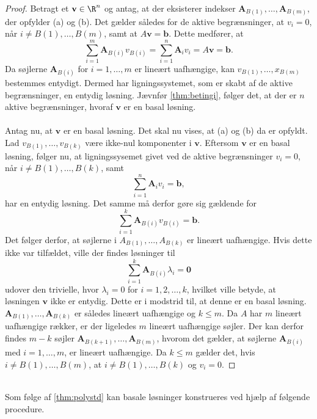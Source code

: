 \begin{proof}
Betragt et $\textbf{v} \in \R^n$ og antag, at der eksisterer indekser $\mathbf{A}_{B(1)},\ldots,\mathbf{A}_{B(m)}$, der opfylder (a) og (b).
%
Det gælder således for de aktive begrænsninger, at $v_i=0$, når $i\neq B(1),\ldots,B(m)$, samt at $A\textbf{v}=\mathbf{b}$.
Dette medfører, at 
%
$$\sum_{i=1}^{m}\textbf{A}_{B(i)}v_{B(i)}=\sum_{i=1}^{n}\textbf{A}_i v_i=A\textbf{v}=\textbf{b}.$$
%
Da søjlerne $\textbf{A}_{B(i)}$ for $i=1,\ldots,m$ er lineært uafhængige, kan $v_{B(1)},\ldots,x_{B(m)}$ bestemmes entydigt. 
Dermed har ligningssystemet, som er skabt af de aktive begrænsninger, en entydig løsning.
Jævnfør \ref{thm:betingi},
følger det, at der er $n$ aktive begrænsninger, hvoraf $\mathbf{v}$ er en basal løsning. 
\\\\
%
%
Antag nu, at $\mathbf{v}$ er en basal løsning. 
Det skal nu vises, at (a) og (b) da er opfyldt.
Lad $v_{B(1)},\ldots,v_{B(k)}$ være ikke-nul komponenter i $\textbf{v}$.
Eftersom $\mathbf{v}$ er en basal løsning, følger nu, at ligningssysemet givet ved de aktive begrænsninger $v_i=0$, når $i\neq B(1),\ldots,B(k)$, samt  $$\sum_{i=1}^{n}\mathbf{A}_i v_i=\mathbf{b},$$ har en entydig løsning. 
Det samme må derfor gøre sig gældende for $$\sum_{i=1}^{k}\mathbf{A}_{B(i)}v_{B(i)}=\mathbf{b}.$$
Det følger derfor, at søjlerne i $A_{B(1)},\ldots,A_{B(k)}$ er lineært uafhængige.
%
Hvis dette ikke var tilfældet, ville der findes løsninger til $$\sum_{i=1}^{k}\mathbf{A}_{B(i)} \lambda_i=\mathbf{0}$$ udover den trivielle, hvor $\lambda_i=0$ for $i=1,2,\ldots,k$, hvilket ville betyde, at løsningen $\mathbf{v}$ ikke er entydig. 
Dette er i modstrid til, at denne er en basal løsning.
$\mathbf{A}_{B(1)},\ldots ,\mathbf{A}_{B(k)}$ er således lineært uafhængige og $k \leq m$.
Da $A$ har $m$ lineært uafhængige rækker, er der ligeledes $m$ lineært uafhængige søjler.
Der kan derfor findes $m-k$ søjler $\textbf{A}_{B(k+1)},\ldots,\textbf{A}_{B(m)}$, hvorom det gælder, at søjlerne $\mathbf{A}_{B(i)}$ med $i=1,\ldots,m$, er lineært uafhængige.
Da $k \leq m$ gælder det, hvis $i \neq B(1),\ldots,B(m)$, at $i \neq B(1),\ldots,B(k)$ og $v_i=0$.
%
\end{proof}
\\
\noindent
Som følge af \ref{thm:polystd} kan basale løsninger konstrueres ved hjælp af følgende procedure.
